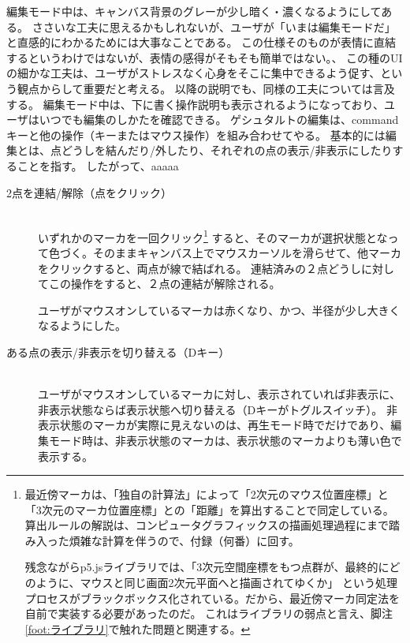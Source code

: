 編集モード中は、キャンバス背景のグレーが少し暗く・濃くなるようにしてある。
ささいな工夫に思えるかもしれないが、ユーザが「いまは編集モードだ」と直感的にわかるためには大事なことである。
この仕様そのものが表情に直結するというわけではないが、表情の感得がそもそも簡単ではない。、
この種のUIの細かな工夫は、ユーザがストレスなく心身をそこに集中できるよう促す、という観点からして重要だと考える。
以降の説明でも、同様の工夫については言及する。
編集モード中は、下に書く操作説明も表示されるようになっており、ユーザはいつでも編集のしかたを確認できる。
ゲシュタルトの編集は、commandキーと他の操作（キーまたはマウス操作）を組み合わせてやる。
基本的には編集とは、点どうしを結んだり/外したり、それぞれの点の表示/非表示にしたりすることを指す。
したがって、aaaaa

\begin{description}    
  \item [2点を連結/解除（点をクリック）]\mbox{}\\
  いずれかのマーカを一回クリック\footnote{  
    最近傍マーカは、「独自の計算法」によって「2次元のマウス位置座標」と「3次元のマーカ位置座標」との「距離」を算出することで同定している。  
    算出ルールの解説は、コンピュータグラフィックスの描画処理過程にまで踏み入った煩雑な計算を伴うので、付録（何番）に回す。
  
    残念ながらp5.jsライブラリでは、「3次元空間座標をもつ点群が、最終的にどのように、マウスと同じ画面2次元平面へと描画されてゆくか」
    という処理プロセスがブラックボックス化されている。だから、最近傍マーカ同定法を自前で実装する必要があったのだ。
    これはライブラリの弱点と言え、脚注\ref{foot:ライブラリ}で触れた問題と関連する。}
    すると、そのマーカが選択状態となって色づく。そのままキャンバス上でマウスカーソルを滑らせて、他マーカをクリックすると、両点が線で結ばれる。
    連結済みの２点どうしに対してこの操作をすると、２点の連結が解除される。

    ユーザがマウスオンしているマーカは赤くなり、かつ、半径が少し大きくなるようにした。
  
    \item [ある点の表示/非表示を切り替える（Dキー）]\mbox{}\\
    ユーザがマウスオンしているマーカに対し、表示されていれば非表示に、非表示状態ならば表示状態へ切り替える（Dキーがトグルスイッチ）。
    非表示状態のマーカが実際に見えないのは、再生モード時でだけであり、編集モード時は、非表示状態のマーカは、表示状態のマーカよりも薄い色で表示する。


\end{description}
